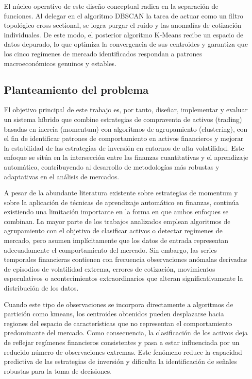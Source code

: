 \documentclass[
]{article}
\begin{document}
	El núcleo operativo de este diseño conceptual radica en la separación de funciones. Al delegar en el algoritmo DBSCAN la tarea de actuar como un filtro topológico cross-sectional, se logra purgar el ruido y las anomalías de cotización individuales. De este modo, el posterior algoritmo K-Means recibe un espacio de datos depurado, lo que optimiza la convergencia de sus centroides y garantiza que los cinco regímenes de mercado identificados respondan a patrones macroeconómicos genuinos y estables.
	
	\subsection{Planteamiento del problema}\label{planteamiento-del-problema}
	
	El objetivo principal de este trabajo es, por tanto, diseñar, implementar y evaluar un sistema híbrido que combine estrategias de compraventa de activos (\gls{trading}) basadas en inercia (\gls{momentum}) con algoritmos de agrupamiento (\gls{clustering}), con el fin de identificar patrones de comportamiento en activos financieros y mejorar la estabilidad de las estrategias de inversión en entornos de alta volatilidad. Este enfoque se sitúa en la intersección entre las finanzas cuantitativas y el aprendizaje automático, contribuyendo al desarrollo de metodologías más robustas y adaptativas en el análisis de mercados.
	
	A pesar de la abundante literatura existente sobre estrategias de \gls{momentum} y sobre la aplicación de técnicas de aprendizaje automático en finanzas, continúa existiendo una limitación importante en la forma en que ambos enfoques se combinan. La mayor parte de los trabajos analizados emplean algoritmos de agrupamiento con el objetivo de clasificar activos o detectar regímenes de mercado, pero asumen implícitamente que los datos de entrada representan adecuadamente el comportamiento del mercado. Sin embargo, las series temporales financieras contienen con frecuencia observaciones anómalas derivadas de episodios de volatilidad extrema, errores de cotización, movimientos especulativos o acontecimientos extraordinarios que alteran significativamente la distribución de los datos.
	
	Cuando este tipo de observaciones se incorpora directamente a algoritmos de partición como \gls{kmeans}, los centroides obtenidos pueden desplazarse hacia regiones del espacio de características que no representan el comportamiento predominante del mercado. Como consecuencia, la clasificación de los activos deja de reflejar regímenes financieros consistentes y pasa a estar influenciada por un reducido número de observaciones extremas. Este fenómeno reduce la capacidad predictiva de las estrategias de inversión y dificulta la identificación de señales robustas para la toma de decisiones.
	
\end{document}
